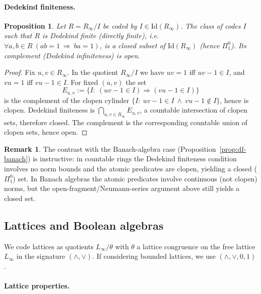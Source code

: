 \documentclass[12pt,fleqn,a4paper]{amsart}
\numberwithin{equation}{section}
\newtheorem{proposition}[theorem]{Proposition}
\theoremstyle{definition}
\newtheorem{remark}[theorem]{Remark}
\newcommand{\Id}{\mathrm{Id}}
\begin{document}
\paragraph{Dedekind finiteness.}

\begin{proposition}\label{prop:ring-df}
Let $R=R_\infty/I$ be coded by $I\in\Id(R_\infty)$.  The class of codes $I$ such that
$R$ is \emph{Dedekind finite} (directly finite), \emph{i.e.}\
$\forall a,b\in R\ (ab=1\ \Rightarrow\ ba=1)$,
is a closed subset of $\Id(R_\infty)$ (hence $\Pi^0_1$).
Its complement (Dedekind infiniteness) is open.
\end{proposition}

\begin{proof}
Fix $u,v\in R_\infty$.  In the quotient $R_\infty/I$ we have $uv=1$ iff $uv-1\in I$,
and $vu=1$ iff $vu-1\in I$.  For fixed $(u,v)$ the set
\[
E_{u,v}:=\{I:\ (uv-1\in I)\Rightarrow(vu-1\in I)\}
\]
is the complement of the clopen cylinder
$\{I:\ uv-1\in I\ \wedge\ vu-1\notin I\}$, hence is clopen.
Dedekind finiteness is $\bigcap_{u,v\in R_\infty}E_{u,v}$, a countable intersection
of clopen sets, therefore closed.
The complement is the corresponding countable union of clopen sets, hence open.
\end{proof}

\begin{remark}\label{rem:ring-df-contrast}
The contrast with the Banach-algebra case (Proposition~\ref{prop:df-banach}) is
instructive: in countable rings the Dedekind finiteness condition involves no norm
bounds and the atomic predicates are clopen, yielding a closed ($\Pi^0_1$) set.
In Banach algebras the atomic predicates involve continuous (not clopen) norms, but
the open-fragment/Neumann-series argument above still yields a closed set.
\end{remark}

\subsection{Lattices and Boolean algebras}\label{subsec:lattices}

We code lattices as quotients $L_\infty/\theta$ with $\theta$ a lattice congruence
on the free lattice $L_\infty$ in the signature $(\wedge,\vee)$.  If considering
bounded lattices, we use $(\wedge,\vee,0,1)$.

\paragraph{Lattice properties.}
\end{document}
